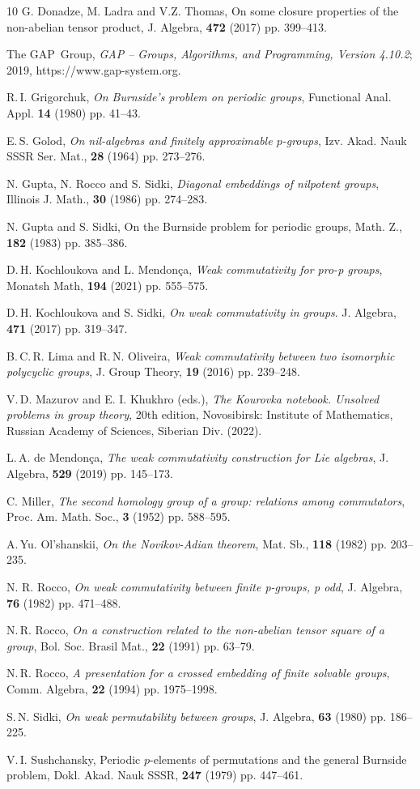 \documentclass[12pt,leqno]{amsart}
\begin{document}
\begin{thebibliography}{10}
 G. Donadze, M. Ladra and V.Z. Thomas, On some closure properties of the non-abelian tensor product, J. Algebra, {\bf 472} (2017) pp. 399--413.

 The GAP~Group, \emph{GAP -- Groups, Algorithms, and Programming, Version 4.10.2}; 2019, https://www.gap-system.org.

 R.\,I. Grigorchuk, {\it On Burnside's problem on periodic groups}, Functional Anal. Appl. {\bf 14} (1980) pp. 41--43.

 E.\,S. Golod, {\it On nil-algebras and finitely approximable $p$-groups}, Izv. Akad. Nauk SSSR Ser. Mat., {\bf 28} (1964) pp. 273--276.

 N. Gupta, N. Rocco and S. Sidki, {\it Diagonal embeddings of nilpotent groups}, Illinois J. Math., {\bf 30} (1986)  pp. 274--283. 

 N. Gupta and S. Sidki, On the Burnside problem for periodic groups, Math. Z., {\bf 182} (1983) pp. 385--386.

 D.\,H. Kochloukova and L. Mendon\c ca, {\it Weak commutativity for pro-p groups}, Monatsh Math, {\bf 194} (2021) pp. 555--575.

 D.\,H. Kochloukova and S. Sidki, \emph{On weak commutativity in groups}. J. Algebra, {\bf 471} (2017) pp. 319--347.

 B.\,C.\,R. Lima and R.\,N. Oliveira, {\it Weak commutativity between two isomorphic polycyclic groups}, J. Group Theory, {\bf 19} (2016) pp. 239--248. 

 V.\,D. Mazurov and E. I. Khukhro (eds.), {\it The Kourovka notebook. Unsolved problems in group theory}, 20th edition, Novosibirsk: Institute of Mathematics, Russian Academy of Sciences, Siberian Div. (2022).  

 L.\,A. de Mendon\c ca, {\it The weak commutativity construction for Lie algebras}, J. Algebra, {\bf 529} (2019) pp. 145--173. 

 C. Miller, {\it The second homology group of a group: relations among commutators}, Proc. Am. Math. Soc., {\bf 3} (1952) pp. 588--595.

 A.\,Yu. Ol'shanskii, {\it On the Novikov-Adian theorem}, Mat. Sb., {\bf 118} (1982)  pp. 203--235.

  N. R. Rocco, {\it On weak commutativity between finite p-groups, p odd}, J. Algebra, {\bf 76} (1982) pp. 471--488.

 N.\,R. Rocco, {\it On a construction related to the non-abelian
tensor square of a group}, Bol. Soc. Brasil Mat., {\bf 22} (1991) pp. 63--79.

 N.\,R. Rocco, {\it A presentation for a crossed embedding of finite solvable groups}, Comm. Algebra, {\bf 22} (1994) pp. 1975--1998.

 S.\,N. Sidki, {\it On weak permutability between groups}, J. Algebra, {\bf 63} (1980) pp. 186--225.

 V.\,I. Sushchansky, Periodic $p$-elements of permutations and the general Burnside problem, Dokl. Akad. Nauk SSSR, {\bf 247} (1979) pp. 447--461.
\end{thebibliography}
\end{document}
